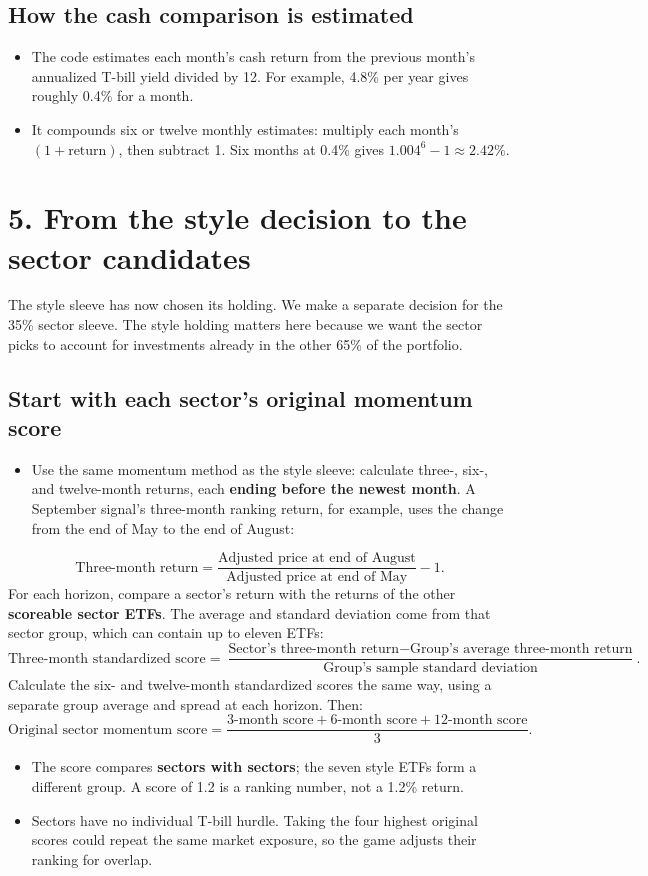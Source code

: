 \documentclass[11pt,letterpaper]{article}
\newcommand{\topic}[1]{\Needspace{5\baselineskip}\subsection*{#1}}
\newcommand{\word}[1]{\text{#1}}
\newcommand{\guidepage}[1]{\clearpage\section*{#1}}
\begin{document}
\topic{How the cash comparison is estimated}
\begin{itemize}
\item The code estimates each month's cash return from the previous month's annualized T-bill yield divided by 12. For example, 4.8\% per year gives roughly 0.4\% for a month.
\item It compounds six or twelve monthly estimates: multiply each month's $(1+\word{return})$, then subtract 1. Six months at 0.4\% gives $1.004^6-1\approx2.42\%$.
\end{itemize}

\guidepage{5. From the style decision to the sector candidates}
\label{sector-overlap}
The style sleeve has now chosen its holding. We make a separate decision for the 35\% sector sleeve. The style holding matters here because we want the sector picks to account for investments already in the other 65\% of the portfolio.

\topic{Start with each sector's original momentum score}
\begin{itemize}
\item Use the same momentum method as the style sleeve: calculate three-, six-, and twelve-month returns, each \textbf{ending before the newest month}. A September signal's three-month ranking return, for example, uses the change from the end of May to the end of August:
\end{itemize}
\[
\word{Three-month return}
=\frac{\word{Adjusted price at end of August}}
{\word{Adjusted price at end of May}}-1.
\]
For each horizon, compare a sector's return with the returns of the other \textbf{scoreable sector ETFs}. The average and standard deviation come from that sector group, which can contain up to eleven ETFs:
\[
\word{Three-month standardized score}
=\frac{\word{Sector's three-month return}-\word{Group's average three-month return}}
{\word{Group's sample standard deviation}}.
\]
Calculate the six- and twelve-month standardized scores the same way, using a separate group average and spread at each horizon. Then:
\[
\word{Original sector momentum score}
=\frac{\word{3-month score}+\word{6-month score}+\word{12-month score}}{3}.
\]
\begin{itemize}
\item The score compares \textbf{sectors with sectors}; the seven style ETFs form a different group. A score of 1.2 is a ranking number, not a 1.2\% return.
\item Sectors have no individual T-bill hurdle. Taking the four highest original scores could repeat the same market exposure, so the game adjusts their ranking for overlap.
\end{itemize}
\end{document}
